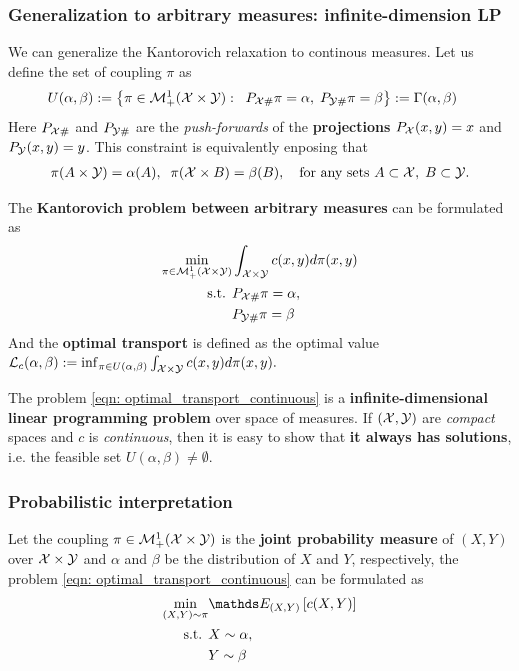 \documentclass[11pt]{article}
\begin{document}
\subsubsection{Generalization to arbitrary measures: infinite-dimension LP}
We can generalize the Kantorovich relaxation to continous measures. Let us define the set of coupling $\pi$ as
\begin{align}
U(\alpha, \beta) &:= \left\{\pi \in {\mathcal M}_{+}^{1}({\mathcal X} \times {\mathcal Y}): \;\; P_{{\mathcal X} \#}\pi = \alpha, \; P_{{\mathcal Y} \#}\pi = \beta\right\} := \Gamma(\alpha, \beta) \label{eqn: coupling_constraint_continous}
\end{align} Here $P_{{\mathcal X} \#}$ and $P_{{\mathcal Y} \#}$ are the \emph{push-forwards}  of the \textbf{projections} $P_{{\mathcal X}}(x, y) = x$ and $P_{{\mathcal Y}}(x, y) = y$. This constraint is equivalently enposing that 
\begin{align*}
\pi(A \times {\mathcal Y}) = \alpha(A), \;\; \pi({\mathcal X} \times B) = \beta(B),\quad \text{for any sets }A\subset {\mathcal X},\; B\subset {\mathcal Y}.
\end{align*}

The \textbf{Kantorovich problem between arbitrary measures} can be formulated as 
\begin{align}
\min_{\pi \in {\mathcal M}_{+}^{1}({\mathcal X} \times {\mathcal Y})}& \int_{{\mathcal X} \times {\mathcal Y}} c(x, y) d \pi(x, y)  \label{eqn: optimal_transport_continuous} \\
\text{s.t. }& P_{{\mathcal X} \#}\pi = \alpha,  \nonumber \\
& P_{{\mathcal Y} \#}\pi = \beta  \nonumber
\end{align} And the \textbf{optimal transport} is defined as the optimal value ${\mathcal L}_{c}(\alpha, \beta) := \inf_{\pi \in U(\alpha, \beta)} \int_{{\mathcal X} \times {\mathcal Y}} c(x, y) d \pi(x, y).$

The problem \eqref{eqn: optimal_transport_continuous} is a \textbf{infinite-dimensional linear programming problem} over space of measures. If $({\mathcal X}, {\mathcal Y})$ are \emph{compact} spaces and $c$ is \emph{continuous}, then it is easy to show that \textbf{it always has solutions}, i.e. the feasible set $U(\alpha, \beta)  \neq \emptyset$. 

\subsubsection{Probabilistic interpretation}
Let the coupling $\pi \in {\mathcal M}_{+}^{1}({\mathcal X} \times {\mathcal Y})$ is the \textbf{joint probability measure} of  $(X, Y)$ over ${\mathcal X} \times {\mathcal Y}$ and $\alpha$ and $\beta$ be the distribution of $X$ and $Y$, respectively,  the problem \eqref{eqn: optimal_transport_continuous} can be formulated as
\begin{align}
\min_{(X, Y) \sim \pi}& \E{(X,Y)}{c(X, Y)}   \label{eqn: optimal_transport_prob} \\
\text{s.t. }&  X \sim \alpha,  \nonumber \\
& Y\sim \beta  \nonumber
\end{align}
\end{document}
